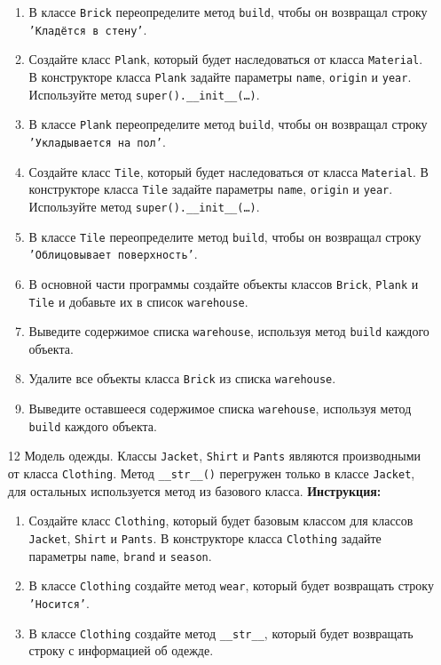 \begin{enumerate}
\begin{enumerate}
    \item В классе \texttt{Brick} переопределите метод \texttt{build}, чтобы он возвращал строку \texttt{'Кладётся в стену'}.
    \item Создайте класс \texttt{Plank}, который будет наследоваться от класса \texttt{Material}. В конструкторе класса \texttt{Plank} задайте параметры \texttt{name}, \texttt{origin} и \texttt{year}. Используйте метод \texttt{super().\_\_init\_\_(\ldots)}.
    \item В классе \texttt{Plank} переопределите метод \texttt{build}, чтобы он возвращал строку \texttt{'Укладывается на пол'}.
    \item Создайте класс \texttt{Tile}, который будет наследоваться от класса \texttt{Material}. В конструкторе класса \texttt{Tile} задайте параметры \texttt{name}, \texttt{origin} и \texttt{year}. Используйте метод \texttt{super().\_\_init\_\_(\ldots)}.
    \item В классе \texttt{Tile} переопределите метод \texttt{build}, чтобы он возвращал строку \texttt{'Облицовывает поверхность'}.
    \item В основной части программы создайте объекты классов \texttt{Brick}, \texttt{Plank} и \texttt{Tile} и добавьте их в список \texttt{warehouse}.
    \item Выведите содержимое списка \texttt{warehouse}, используя метод \texttt{build} каждого объекта.
    \item Удалите все объекты класса \texttt{Brick} из списка \texttt{warehouse}.
    \item Выведите оставшееся содержимое списка \texttt{warehouse}, используя метод \texttt{build} каждого объекта.
\end{enumerate}
\item[12]
Модель одежды. Классы \texttt{Jacket}, \texttt{Shirt} и \texttt{Pants} являются производными от класса \texttt{Clothing}. Метод \texttt{\_\_str\_\_()} перегружен только в классе \texttt{Jacket}, для остальных используется метод из базового класса.
\textbf{Инструкция:}
\begin{enumerate}
    \item Создайте класс \texttt{Clothing}, который будет базовым классом для классов \texttt{Jacket}, \texttt{Shirt} и \texttt{Pants}. В конструкторе класса \texttt{Clothing} задайте параметры \texttt{name}, \texttt{brand} и \texttt{season}.
    \item В классе \texttt{Clothing} создайте метод \texttt{wear}, который будет возвращать строку \texttt{'Носится'}.
    \item В классе \texttt{Clothing} создайте метод \texttt{\_\_str\_\_}, который будет возвращать строку с информацией об одежде.

\end{enumerate}
\end{enumerate}
